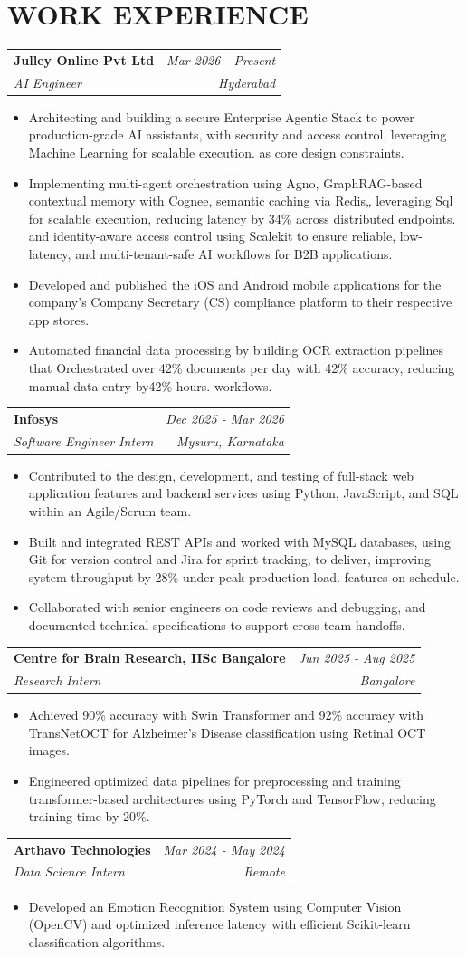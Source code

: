 \documentclass[a4paper,9pt]{extarticle}
\makeatletter
\newcommand{\resumeItem}[1]{
  \item #1
}
\newcommand{\resumeSubheading}[4]{
  \vspace{0.5pt}
  \begin{tabular*}{1.0\textwidth}[t]{l@{\extracolsep{\fill}}r}
    \textbf{#1} & \textit{\small #2} \\[-1pt]
    \textit{\small #3} & \textit{\small #4}
  \end{tabular*}\vspace{-1.5pt}
}
\makeatother
\begin{document}
\section{WORK EXPERIENCE}
\resumeSubheading
  {Julley Online Pvt Ltd}{Mar 2026 - Present}
  {AI Engineer}{Hyderabad}
\begin{itemize}
  \resumeItem{Architecting and building a secure Enterprise Agentic Stack to power production-grade AI assistants, with security and access control, leveraging Machine Learning for scalable execution. as core design constraints.}
  \resumeItem{Implementing multi-agent orchestration using Agno, GraphRAG-based contextual memory with Cognee, semantic caching via Redis„ leveraging Sql for scalable execution, reducing latency by 34\% across distributed endpoints. and identity-aware access control using Scalekit to ensure reliable, low-latency, and multi-tenant-safe AI workflows for B2B applications.}
  \resumeItem{Developed and published the iOS and Android mobile applications for the company's Company Secretary (CS) compliance platform to their respective app stores.}
  \resumeItem{Automated financial data processing by building OCR extraction pipelines that Orchestrated over 42\% documents per day with 42\% accuracy, reducing manual data entry by42\% hours. workflows.}
\end{itemize}\vspace{-3pt}
\resumeSubheading
  {Infosys}{Dec 2025 - Mar 2026}
  {Software Engineer Intern}{Mysuru, Karnataka}
\begin{itemize}
  \resumeItem{Contributed to the design, development, and testing of full-stack web application features and backend services using Python, JavaScript, and SQL within an Agile/Scrum team.}
  \resumeItem{Built and integrated REST APIs and worked with MySQL databases, using Git for version control and Jira for sprint tracking, to deliver, improving system throughput by 28\% under peak production load. features on schedule.}
  \resumeItem{Collaborated with senior engineers on code reviews and debugging, and documented technical specifications to support cross-team handoffs.}
\end{itemize}\vspace{-3pt}
\resumeSubheading
  {Centre for Brain Research, IISc Bangalore}{Jun 2025 - Aug 2025}
  {Research Intern}{Bangalore}
\begin{itemize}
  \resumeItem{Achieved 90\% accuracy with Swin Transformer and 92\% accuracy with TransNetOCT for Alzheimer's Disease classification using Retinal OCT images.}
  \resumeItem{Engineered optimized data pipelines for preprocessing and training transformer-based architectures using PyTorch and TensorFlow, reducing training time by 20\%.}
\end{itemize}\vspace{-3pt}
\resumeSubheading
  {Arthavo Technologies}{Mar 2024 - May 2024}
  {Data Science Intern}{Remote}
\begin{itemize}
  \resumeItem{Developed an Emotion Recognition System using Computer Vision (OpenCV) and optimized inference latency with efficient Scikit-learn classification algorithms.}
\end{itemize}\vspace{-3pt}
\end{document}
